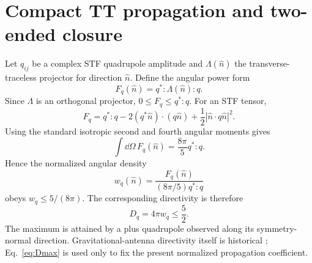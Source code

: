 \section{Compact TT propagation and two-ended closure}
\label{sec:propagation}

Let $q_{ij}$ be a complex STF quadrupole amplitude and $\Lambda(\hat n)$ the transverse-traceless projector for direction $\hat n$. Define the angular power form
\begin{equation}
F_q(\hat n)=q^*:\Lambda(\hat n):q .
\end{equation}
Since $\Lambda$ is an orthogonal projector, $0\le F_q\le q^*:q$. For an STF tensor,
\begin{equation}
F_q=q^*:q-2(q^*\hat n)\cdot(q\hat n)
+\frac12|\hat n\cdot q\hat n|^2 .
\end{equation}
Using the standard isotropic second and fourth angular moments gives
\begin{equation}
\boxed{
\int\dd\Omega\,F_q(\hat n)=\frac{8\pi}{5}q^*:q .
}
\label{eq:Fint}
\end{equation}
Hence the normalized angular density
\begin{equation}
w_q(\hat n)=\frac{F_q(\hat n)}{(8\pi/5)q^*:q}
\end{equation}
obeys $w_q\le5/(8\pi)$. The corresponding directivity is therefore
\begin{equation}
\boxed{D_q=4\pi w_q\le\frac52 .}
\label{eq:Dmax}
\end{equation}
The maximum is attained by a plus quadrupole observed along its symmetry-normal direction. Gravitational-antenna directivity itself is historical \cite{Hirakawa1976}; Eq.~\eqref{eq:Dmax} is used only to fix the present normalized propagation coefficient.

